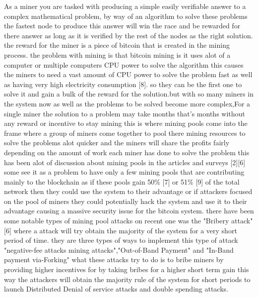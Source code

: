 \documentclass[report]{IEEEtran}
\begin{document}
 As a miner you are tasked with producing a simple easily verifiable answer to a complex mathematical problem, by way of an algorithm to solve these problems the fastest node to produce this answer will win the race and be rewarded for there answer as long as it is verified by the rest of the nodes as the right solution. the reward for the miner is a piece of bitcoin that is created in the  mining process. the problem with mining is that bitcoin mining is it uses alot of a computer or multiple computers CPU power to solve the algorithm this causes the miners to need a vast amount of CPU power to solve the problem fast as well as having very high electricity consumption [8]. so they can be the first one to solve it and gain a bulk of the reward for the solution.but with so many miners in the system now as well as the problems to be solved become more complex,For a single miner the solution to a problem may take months that's months without any reward or incentive to stay mining this is where mining pools come into the frame where a group of miners come together to pool there mining resources to solve the problems alot quicker and the miners will share the profits fairly depending on the amount of work each miner has done to solve the problem this has been alot of discussion about mining pools in the articles and surveys [2][6] some see it as a problem to have only a few mining pools that are contributing mainly to the blockchain as if these pools gain 50\% [7] or 51\% [9] of the total network then they could use the system to their advantage or if attackers focused on the pool of miners they could potentially hack the system and use it to their advantage causing a massive security issue for the bitcoin system. there have been some notable types of mining pool attacks on recent one was the "Bribery attack"[6] where a attack will try obtain the majority of the system for a very short period of time. they are three types of ways to implement this type of attack "negative-fee attacks mining attacks","Out-of-Band Payment" and "In-Band payment via-Forking" what these attacks try to do is to bribe miners by providing higher incentives for by taking bribes for a higher short term gain this way the attackers will obtain the majority rule of the system for short periods to launch Distributed Denial of service attacks and double spending attacks.  
\end{document}
